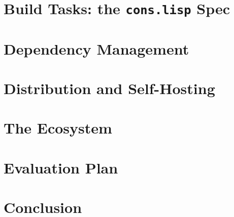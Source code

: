\documentclass[11pt,a4paper]{article}
\begin{document}
\section{Build Tasks: the \texttt{cons.lisp} Spec}
\label{sec:tasks}

\section{Dependency Management}
\label{sec:deps}

\section{Distribution and Self-Hosting}
\label{sec:dist}

\section{The Ecosystem}
\label{sec:ecosystem}

\section{Evaluation Plan}
\label{sec:eval}

\section{Conclusion}
\label{sec:conclusion}



\end{document}
